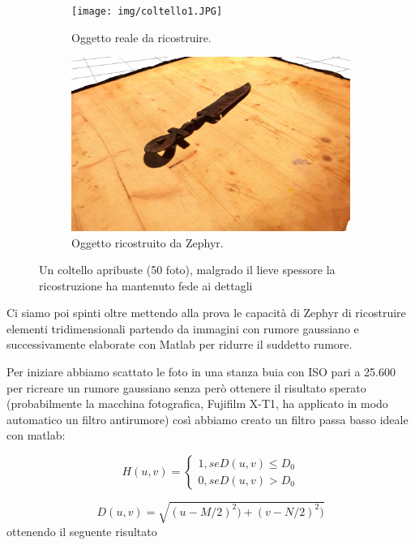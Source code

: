 \documentclass[12pt]{report}
\begin{document}
\begin{figure}[H]
  \centering
  \begin{subfigure}[b]{0.37\linewidth}
    \centering
    \texttt{[image: img/coltello1.JPG]}
    \caption{Oggetto reale da ricostruire.}
  \end{subfigure}
  \begin{subfigure}[b]{0.4\linewidth}
    \centering
    \includegraphics[width=\linewidth]{img/coltello.png}
    \caption{Oggetto ricostruito da Zephyr.}
  \end{subfigure}
  \captionsetup{justification=centering}
  \caption{Un coltello apribuste (50 foto), malgrado il lieve spessore la ricostruzione ha mantenuto fede ai dettagli}
\end{figure}

Ci siamo poi spinti oltre mettendo alla prova le capacit\`a di Zephyr di ricostruire elementi tridimensionali partendo da immagini con rumore gaussiano e successivamente elaborate con Matlab per ridurre il suddetto rumore.

Per iniziare abbiamo scattato le foto in una stanza buia con ISO pari a 25.600 per ricreare un rumore gaussiano senza per\`o ottenere il risultato sperato (probabilmente la macchina fotografica, Fujifilm X-T1, ha applicato in modo automatico un filtro antirumore) cos\`i abbiamo creato un filtro passa basso ideale con matlab:

\begin{equation}
H(u,v) = 
\begin{cases}
1,se D(u,v)\leq D_0
\\
0,se D(u,v)>D_0
\end{cases}
\end{equation}

\begin{equation}
D(u,v) = \sqrt{(u-M/2)^{2}) + (v-N/2)^{2})}   
\end{equation}
\newpage
 \noindent ottenendo il seguente risultato
\end{document}
